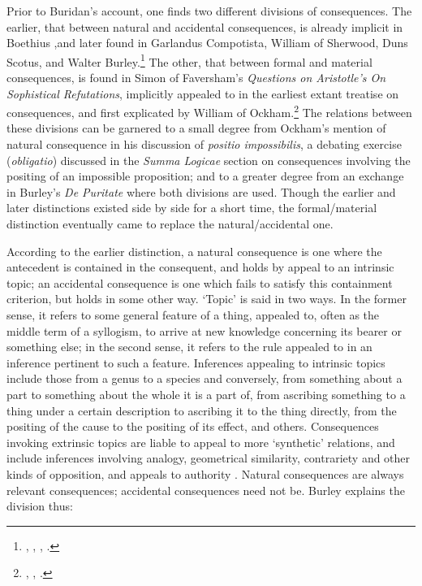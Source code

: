 \documentclass[]{article}
\begin{document}
Prior to Buridan's account, one finds two different divisions of consequences. The earlier, that between natural and accidental consequences, is already implicit in Boethius \autocite[835B]{BHS},and later found in Garlandus Compotista, William of Sherwood, Duns Scotus, and Walter Burley.\footnote{\autocite[80]{Sherwood1941}, \autocite[141]{Garlandus1959}, \autocite[I, d. 11, q. 2, pp. 136-137]{ScotusLectura}, \autocite[128-129]{Green-Pedersen1980b}.} The other, that between formal and material consequences, is found in Simon of Faversham's \textit{Questions on Aristotle's On Sophistical Refutations}, implicitly appealed to in the earliest extant treatise on consequences, and first explicated by William of Ockham.\footnote{\autocite[qq. 36-37]{FavershamQE}, \autocite[7, par. 18]{Green-Pedersen1980a}, \autocite[III-3. 1, p. 589]{OckhamSL}.} The relations between these divisions can be garnered to a small degree from Ockham's mention of natural consequence in his discussion of \textit{positio impossibilis}, a debating exercise (\textit{obligatio}) discussed in the \textit{Summa Logicae} section on consequences involving the positing of an impossible proposition;\autocite[III-3. 42]{OckhamSL} and to a greater degree from an exchange in Burley's \textit{De Puritate} where both divisions are used.\autocite[80.13-29, 84.8-86.21]{BurleyDPAL} Though the earlier and later distinctions existed side by side for a short time, the formal/material distinction eventually came to replace the natural/accidental one.

According to the earlier distinction, a natural consequence is one where the antecedent is contained in the consequent, and holds by appeal to an intrinsic topic; an accidental consequence is one which fails to satisfy this containment criterion, but holds in some other way. `Topic' is said in two ways. In the former sense, it refers to some general feature of a thing, appealed to, often as the middle term of a syllogism, to arrive at new knowledge concerning its bearer or something else; in the second sense, it refers to the rule appealed to in an inference pertinent to such a feature. Inferences appealing to intrinsic topics include those from a genus to a species and conversely, from something about a part to something about the whole it is a part of, from ascribing something to a thing under a certain description to ascribing it to the thing directly, from the positing of the cause to the positing of its effect, and others. Consequences invoking extrinsic topics are liable to appeal to more `synthetic' relations, and include inferences involving analogy, geometrical similarity, contrariety and other kinds of opposition, and appeals to authority \autocite[Bk. II]{BDT}. Natural consequences are always relevant consequences; accidental consequences need not be. Burley explains the division thus:
\end{document}
